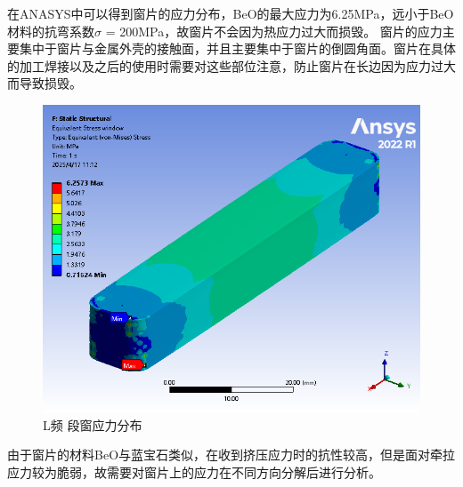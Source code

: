 \documentclass[master]{thesis-uestc}
\begin{document}
在ANASYS中可以得到窗片的应力分布，BeO的最大应力为6.25MPa，远小于BeO材料的抗弯系数\(\sigma\) = 200MPa，故窗片不会因为热应力过大而损毁。
窗片的应力主要集中于窗片与金属外壳的接触面，并且主要集中于窗片的倒圆角面。窗片在具体的加工焊接以及之后的使用时需要对这些部位注意，防止窗片在长边因为应力过大而导致损毁。
\begin{figure}[!htb]
    \centering
    \includegraphics[width=0.45\linewidth]{pic/chapter4/L频段窗应力.png}
    \caption{L频        段窗应力分布}
    \label{fig:L频段窗应力分布}
\end{figure}

由于窗片的材料BeO与蓝宝石类似，在收到挤压应力时的抗性较高，但是面对牵拉应力较为脆弱，故需要对窗片上的应力在不同方向分解后进行分析。
\end{document}
